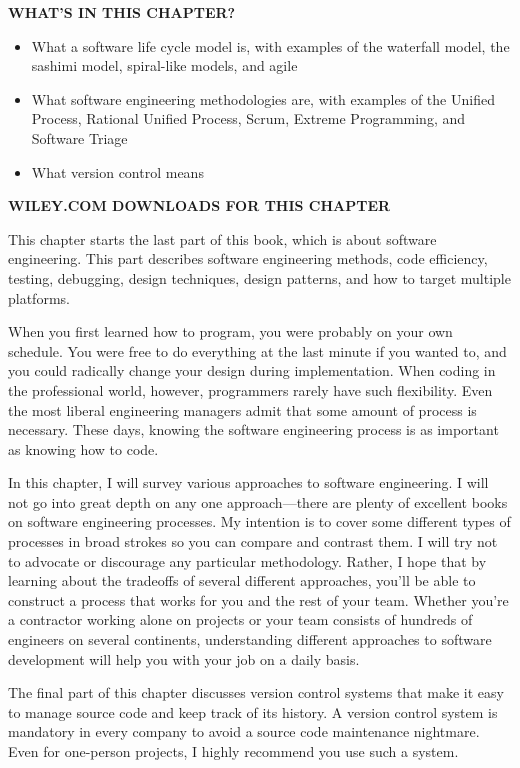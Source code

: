 \noindent
\textbf{WHAT’S IN THIS CHAPTER?}

\begin{itemize}
\item
What a software life cycle model is, with examples of the waterfall model, the sashimi model, spiral-like models, and agile

\item
What software engineering methodologies are, with examples of the Unified Process, Rational Unified Process, Scrum, Extreme Programming, and Software Triage

\item
What version control means
\end{itemize}

\noindent
\textbf{WILEY.COM DOWNLOADS FOR THIS CHAPTER}

This chapter starts the last part of this book, which is about software engineering. This part describes software engineering methods, code efficiency, testing, debugging, design techniques, design patterns, and how to target multiple platforms.

When you first learned how to program, you were probably on your own schedule. You were free to do everything at the last minute if you wanted to, and you could radically change your design during implementation. When coding in the professional world, however, programmers rarely have such flexibility. Even the most liberal engineering managers admit that some amount of process is necessary. These days, knowing the software engineering process is as important as knowing how to code.

In this chapter, I will survey various approaches to software engineering. I will not go into great depth on any one approach—there are plenty of excellent books on software engineering processes. My intention is to cover some different types of processes in broad strokes so you can compare and contrast them. I will try not to advocate or discourage any particular methodology. Rather, I hope that by learning about the tradeoffs of several different approaches, you’ll be able to construct a process that works for you and the rest of your team. Whether you’re a contractor working alone on projects or your team consists of hundreds of engineers on several continents, understanding different approaches to software development will help you with your job on a daily basis.

The final part of this chapter discusses version control systems that make it easy to manage source code and keep track of its history. A version control system is mandatory in every company to avoid a source code maintenance nightmare. Even for one-person projects, I highly recommend you use such a system.







